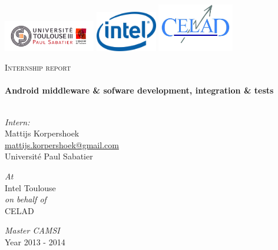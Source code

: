 \begin{titlepage}



\begin{minipage}{\textwidth}
\includegraphics[width=0.30\textwidth]{./src/img/logoups.jpg}
\hfill \includegraphics[width=0.20\textwidth]{./src/img/logointel.jpg} \hfill
\includegraphics[width=0.25\textwidth]{./src/img/logocelad.jpg}
\end{minipage}

\begin{center}

\vfill

\textsc{\LARGE Internship report}\\[0.5cm]

\titleRule \\[0.4cm]
{ \huge \bfseries Android middleware \& sofware development, integration \& tests}\\[0.4cm]

\titleRule \\[1.5cm]

\vfill

\begin{minipage}{0.4\textwidth}
\begin{flushleft} \large
\emph{Intern:}\\
Mattijs Korpershoek\\
\href{mailto:mattijs.korpershoek@gmail.com}{mattijs.korpershoek@gmail.com}\\
Université Paul Sabatier\\
\end{flushleft}
\end{minipage}
\begin{minipage}{0.4\textwidth}
\begin{flushright} \large
\emph{At} \\
Intel Toulouse \\
\emph{on behalf of}\\
CELAD\\
\end{flushright}
\end{minipage}

\vfill

\emph{Master CAMSI}\\
Year 2013 - 2014

\end{center}

\end{titlepage}
